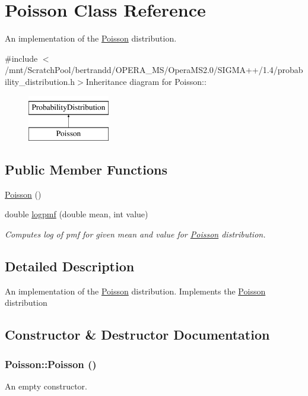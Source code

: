 \hypertarget{classPoisson}{
\section{Poisson Class Reference}
\label{classPoisson}
}


An implementation of the \hyperlink{classPoisson}{Poisson} distribution.  


{\ttfamily \#include $<$/mnt/ScratchPool/bertrandd/OPERA\_\-MS/OperaMS2.0/SIGMA++/1.4/probability\_\-distribution.h$>$}Inheritance diagram for Poisson::\begin{figure}[H]
\begin{center}
\leavevmode
\includegraphics[height=2cm]{classPoisson}
\end{center}
\end{figure}
\subsection*{Public Member Functions}
\begin{DoxyCompactItemize}
\item 
\hyperlink{classPoisson_adbd1c3f43c4942e54bc8223a4bef52b1}{Poisson} ()
\item 
double \hyperlink{classPoisson_acf02dfa9d438104f7d7feb17af5b01d6}{logpmf} (double mean, int value)
\begin{DoxyCompactList}\small\item\em Computes log of pmf for given mean and value for \hyperlink{classPoisson}{Poisson} distribution. \item\end{DoxyCompactList}\end{DoxyCompactItemize}


\subsection{Detailed Description}
An implementation of the \hyperlink{classPoisson}{Poisson} distribution. Implements the \hyperlink{classPoisson}{Poisson} distribution 

\subsection{Constructor \& Destructor Documentation}
\hypertarget{classPoisson_adbd1c3f43c4942e54bc8223a4bef52b1}{
\subsubsection[{Poisson}]{\setlength{\rightskip}{0pt plus 5cm}Poisson::Poisson ()}}
\label{classPoisson_adbd1c3f43c4942e54bc8223a4bef52b1}
An empty constructor. 

